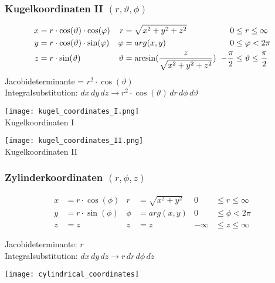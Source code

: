 \subsubsection{Kugelkoordinaten II $(r, \vartheta, \phi)$}
\begin{align*}
	x &= r \cdot \cos(\vartheta) \cdot \cos(\phi) & r &= \sqrt{x^2 + y^2 + z^2} & 0 &\leq r \leq \infty\\
	y &= r \cdot \cos(\vartheta) \cdot \sin(\phi) & \phi &= arg(x, y) & 0 &\leq \phi < 2\pi\\
	z &= r \cdot \sin(\vartheta) & \vartheta &= \arcsin({\small \frac{z}{\sqrt{x^2 + y^2 + z^2}}}) &\hspace{-0.15cm}-\frac{\pi}{2} &\leq \vartheta \leq \frac{\pi}{2}
\end{align*}
Jacobideterminante = $r^2 \cdot \cos(\vartheta)$\\
Integralsubstitution: $dx \, dy\, dz \to r^2 \cdot \cos(\vartheta) \, dr \, d\phi \, d\vartheta$\\


\begin{minipage}{0.5\columnwidth}
	\texttt{[image: kugel\_coordinates\_I.png]}\\
	Kugelkoordinaten I
\end{minipage}
\begin{minipage}{0.5\columnwidth}
	\texttt{[image: kugel\_coordinates\_II.png]}\\
	Kugelkoordinaten II
\end{minipage}

\newpage
\subsubsection{Zylinderkoordinaten $(r, \phi, z)$}
\begin{align*}
	x &= r \cdot \cos(\phi) &  r &= \sqrt{x^2 + y^2} & 0 &\leq r \leq \infty\\
	y &= r \cdot \sin(\phi) &  \phi &= arg(x, y) & 0 &\leq \phi < 2\pi\\
	z &= z & z &= z & -\infty & \leq z \leq \infty
\end{align*}
\begin{minipage}{0.68\columnwidth}
	Jacobideterminante: $r$\\
	Integralsubstitution: $dx \, dy \, dz \to r \, dr \, d\phi \, dz$
\end{minipage}
\begin{minipage}{0.31\columnwidth}
	\hspace{-0.3cm}\texttt{[image: cylindrical\_coordinates]}
\end{minipage}


